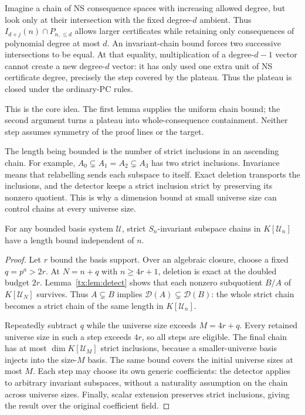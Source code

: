 Imagine a chain of NS consequence spaces with increasing allowed degree,
but look only at their intersection with the fixed degree-$d$ ambient.
Thus $I_{d+j}(n)\cap P_{n,\le d}$ allows larger certificates while
retaining only consequences of polynomial degree at most $d$.
An invariant-chain bound forces two successive intersections to be equal.
At that equality, multiplication of a degree-$d-1$ vector cannot create
a new degree-$d$ vector: it has only used one extra unit of NS certificate
degree, precisely the step covered by the plateau. Thus the plateau is
closed under the ordinary-PC rules.

This is the core idea. The first lemma supplies the uniform chain bound;
the second argument turns a plateau into whole-consequence containment.
Neither step assumes symmetry of the proof lines or the target.

The length being bounded is the number of strict inclusions in an
ascending chain. For example, $A_0\subsetneq A_1=A_2\subsetneq A_3$ has two strict
inclusions. Invariance means that relabelling sends each subspace to
itself. Exact deletion transports the inclusions, and the
detector keeps a strict inclusion strict by preserving its nonzero
quotient. This is why a dimension bound at small universe size can control
chains at every universe size.

\begin{lemma}\label{tx:lem:chains}
For any bounded basis system $\mathcal U$, strict $S_n$-invariant
subspace chains in $K[\mathcal U_n]$ have a length bound independent of $n$.
\end{lemma}
\begin{proof}
Let $r$ bound the basis support. Over an algebraic closure, choose a
fixed $q=p^a>2r$. At $N=n+q$ with $n\ge4r+1$, deletion is exact at the
doubled budget $2r$. Lemma~\ref{tx:lem:detect} shows that each nonzero
subquotient $B/A$ of $K[\mathcal U_N]$ survives. Thus
$A\subsetneq B$ implies
$\mathcal D(A)\subsetneq\mathcal D(B)$: the whole strict chain becomes
a strict chain of the same length in $K[\mathcal U_n]$.

Repeatedly subtract $q$ while the universe size exceeds $M=4r+q$. Every retained
universe size in such a step exceeds $4r$, so all steps are eligible. The final
chain has at most $\dim K[\mathcal U_M]$ strict inclusions, because a
smaller-universe basis injects into the size-$M$ basis. The same bound covers
the initial universe sizes at most $M$. Each step may choose its own generic
coefficients: the detector applies to arbitrary invariant subspaces,
without a naturality assumption on the chain across universe sizes. Finally,
scalar extension preserves strict inclusions, giving the result over
the original coefficient field.
\end{proof}

